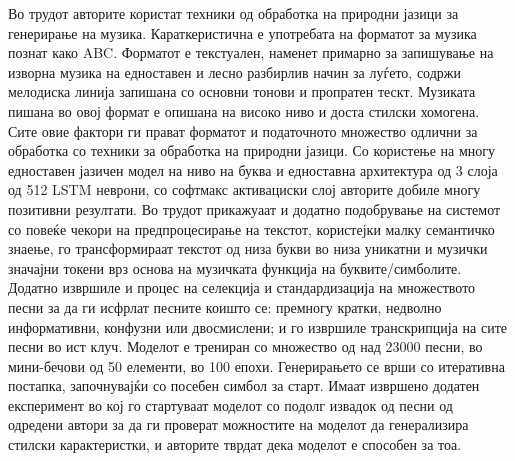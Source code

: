 Во трудот \cite{Sturm2016} авторите користат техники од обработка на природни јазици за генерирање на музика. Караткеристична е употребата на форматот за музика познат како ABC. Форматот е текстуален, наменет примарно за запишување на изворна музика на едноставен и лесно разбирлив начин за луѓето, содржи мелодиска линија запишана со основни тонови и пропратен тескт. Музиката пишана во овој формат е опишана на високо ниво и доста стилски хомогена. Сите овие фактори ги прават форматот и податочното множество одлични за обработка со техники за обработка на природни јазици. Со користење на многу едноставен јазичен модел на ниво на буква и едноставна архитектура од 3 слоја од 512 LSTM неврони, со софтмакс активациски слој авторите добиле многу позитивни резултати. Во трудот прикажуаат и додатно подобрување на системот со повеќе чекори на предпроцесирање на текстот, користејки малку семантичко знаење, го трансформираат текстот од низа букви во низа уникатни и музички значајни токени врз основа на музичката функција на буквите/симболите. Додатно извршиле и процес на селекција и стандардизација на множеството песни за да ги исфрлат песните коишто се: премногу кратки, недволно информативни, конфузни или двосмислени; и го извршиле транскрипција на сите песни во ист клуч. Моделот е трениран со множество од над 23000 песни, во мини-бечови од 50 елементи, во 100 епохи. Генерирањето се врши со итеративна постапка, започнувајќи со посебен симбол за старт. Имаат извршено додатен експеримент во кој го стартуваат моделот со подолг извадок од песни од одредени автори за да ги проверат можностите на моделот да генерализира стилски карактеристки, и авторите тврдат дека моделот е способен за тоа.

